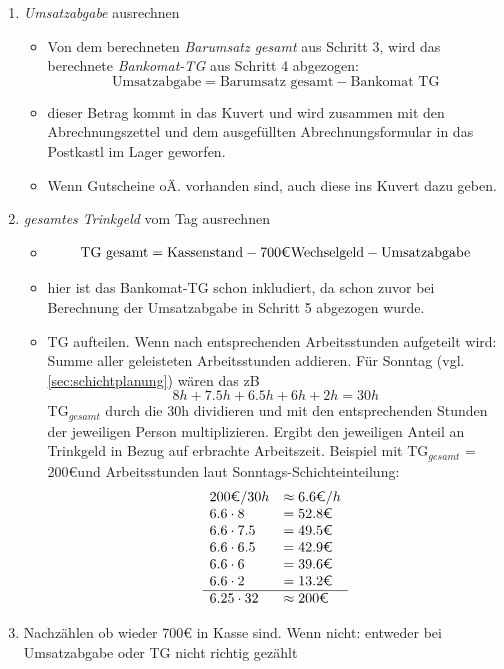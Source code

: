 \documentclass[a4paper,12pt]{article}
\newcounter{row}
\begin{document}
\begin{enumerate}[itemsep=2em, leftmargin=1em]
    \item \textit{Umsatzabgabe} ausrechnen
    \begin{itemize}[topsep=0pt, itemsep=1pt]
         \item[$\rightarrow$] Von dem berechneten \textit{Barumsatz gesamt} aus Schritt 3, wird das berechnete \textit{Bankomat-TG} aus Schritt 4 abgezogen:
         \[ \text{Umsatzabgabe} = \text{Barumsatz gesamt} - \text{Bankomat TG} \]
         \item[$\rightarrow$] dieser Betrag kommt in das Kuvert und wird zusammen mit den Abrechnungszettel und dem ausgefüllten Abrechnungsformular in das Postkastl im Lager geworfen.
         \item[$\rightarrow$] Wenn Gutscheine oÄ. vorhanden sind, auch diese ins Kuvert dazu geben.
    \end{itemize}

    \item \textit{gesamtes Trinkgeld} vom Tag ausrechnen
    \begin{itemize}[topsep=0pt, itemsep=1pt]
         \item[] \[ \text{TG gesamt} = \text{Kassenstand} - 700\text{\euro} \text{Wechselgeld} - \text{Umsatzabgabe} \]
         \item[$\rightarrow$] hier ist das Bankomat-TG schon inkludiert, da schon zuvor bei Berechnung der Umsatzabgabe in Schritt 5 abgezogen wurde. 
         \item[$\rightarrow$] TG aufteilen. Wenn nach entsprechenden Arbeitsstunden aufgeteilt wird: Summe aller geleisteten Arbeitsstunden addieren. Für Sonntag (vgl. \cref{sec:schichtplanung}) wären das zB
         \[ 8h + 7.5h + 6.5h + 6h + 2h = 30h\]
         TG$_{gesamt}$ durch die 30h dividieren und mit den entsprechenden Stunden der jeweiligen Person multiplizieren. Ergibt den jeweiligen Anteil an Trinkgeld in Bezug auf erbrachte Arbeitszeit.
         Beispiel mit TG$_{gesamt}$ = 200\euro und Arbeitsstunden laut Sonntags-Schichteinteilung:
         \begin{align*}
         \begin{array}{ll}
             200\text{\euro} / 30h & \approx 6.6 \text{\euro}/h \\
             6.6 \cdot 8 &= 52.8\text{\euro} \\
             6.6 \cdot 7.5 &= 49.5\text{\euro} \\
             6.6 \cdot 6.5 &= 42.9\text{\euro} \\
             6.6 \cdot 6 &= 39.6\text{\euro} \\
             6.6 \cdot 2 &= 13.2\text{\euro} \\
             \hline
             6.25 \cdot 32 & \approx 200\text{\euro}
         \end{array}
         \end{align*}
    \end{itemize}

    \item Nachzählen ob wieder 700€ in Kasse sind. Wenn nicht: entweder bei Umsatzabgabe oder TG nicht richtig gezählt

\end{enumerate}
\end{document}
